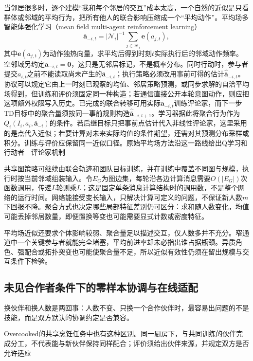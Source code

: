 当邻居很多时，逐个建模“我和每个邻居的交互”成本太高，一个自然的近似是只看群体或邻域的平均行为，把所有他人的联合影响压缩成一个“平均动作”。平均场多智能体强化学习（mean field multi-agent reinforcement learning）
\[
 \bar{\bm a}_{-i,t}
 =|\mathcal N_i|^{-1}\sum_{j\in\mathcal N_i}\bm e(a_{j,t}),
\]
其中$\bm e(a_{j,t})$为动作独热向量，求平均后得到时刻$t$实际执行后的邻域动作频率。空邻域另约定$\bar{\bm a}_{-i,t}=\bm0$，这只是无邻居标记，不是概率分布。同时行动时，参与者提交$a_{i,t}$之前不能读取尚未产生的$\bar{\bm a}_{-i,t}$；执行策略必须改用事前可得的估计$\widehat{\bar{\bm a}}_{-i,t}$。协议可以规定它由上一时刻已观察的均值、邻居策略预测，或同步求解的自洽平均场得到，但训练和评价须固定同一种构造；若通信直接公开本轮意图动作，则应把这项额外权限写入历史。已完成的联合转移可用实际$\bar{\bm a}_{-i,t}$训练评论家，而下一步TD目标中的聚合量须按同一事前规则构造$\widehat{\bar{\bm a}}_{-i,t+1}$。学习器据此将聚合行为作为$Q_i(I_i,a_i,\bar{\bm a}_{-i})$的条件。若后继目标只把事前点估计代入非线性评论家，这里采用的是点代入近似；若要计算对未来实际均值的条件期望，还需对其预测分布采样或积分。训练与评价应保留同一近似口径。原始平均场方法沿这一路线给出Q学习和行动者—评论家机制

共享图策略可继续由联合轨迹和团队目标训练，并在训练中覆盖不同图与规模，执行时按当前邻域组装输入。令$E_G$为图边集，每轮沿各边计算消息需要$O(|E_G|)$次函数调用，传递$L$轮则乘$L$；这是固定单条消息计算结构时的调用数，不是整个网络的运行时间。网络能接受变长输入，只解决计算可定义的问题，不保证新人数$m$下回报不降。聚合方式也决定哪些局部特征差别仍可区分：求和随人数变化，均值可能丢掉邻居数量，即便置换等变也可能需要显式计数或密度特征。

平均场近似还要求个体影响较弱、聚合量足以描述交互，仅人数多并不充分。窄通道中一个关键参与者就能完全堵塞，平均前进率却未必指出谁占据瓶颈。异质角色、强配合或拓扑突变也可能使聚合量不足，所以近似有效性仍须在留出规模与交互条件下检验。

\subsection{未见合作者条件下的零样本协调与在线适配}
\label{sec:rl-multi-agent-new-partners}

换伙伴和换人数是两回事：人数不变、只换一个合作伙伴时，最容易出问题的不是技能，而是双方默认的协调约定是否兼容。

Overcooked的共享烹饪任务中也有这种区别。同一厨房下，与共同训练的伙伴完成分工，不代表能与新伙伴保持同样配合；评价须给出伙伴来源，并规定双方是否允许适应

